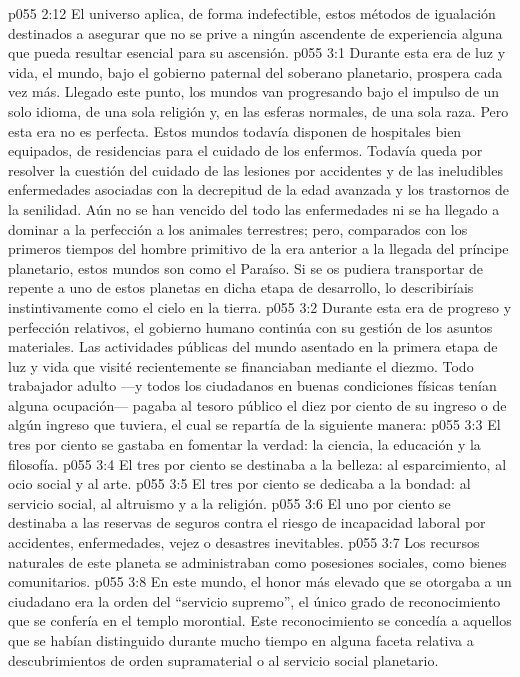 \vs p055 2:12 El universo aplica, de forma indefectible, estos métodos de igualación destinados a asegurar que no se prive a ningún ascendente de experiencia alguna que pueda resultar esencial para su ascensión.
\vs p055 3:1 Durante esta era de luz y vida, el mundo, bajo el gobierno paternal del soberano planetario, prospera cada vez más. Llegado este punto, los mundos van progresando bajo el impulso de un solo idioma, de una sola religión y, en las esferas normales, de una sola raza. Pero esta era no es perfecta. Estos mundos todavía disponen de hospitales bien equipados, de residencias para el cuidado de los enfermos. Todavía queda por resolver la cuestión del cuidado de las lesiones por accidentes y de las ineludibles enfermedades asociadas con la decrepitud de la edad avanzada y los trastornos de la senilidad. Aún no se han vencido del todo las enfermedades ni se ha llegado a dominar a la perfección a los animales terrestres; pero, comparados con los primeros tiempos del hombre primitivo de la era anterior a la llegada del príncipe planetario, estos mundos son como el Paraíso. Si se os pudiera transportar de repente a uno de estos planetas en dicha etapa de desarrollo, lo describiríais instintivamente como el cielo en la tierra.
\vs p055 3:2 \pc Durante esta era de progreso y perfección relativos, el gobierno humano continúa con su gestión de los asuntos materiales. Las actividades públicas del mundo asentado en la primera etapa de luz y vida que visité recientemente se financiaban mediante el diezmo. Todo trabajador adulto ---y todos los ciudadanos en buenas condiciones físicas tenían alguna ocupación--- pagaba al tesoro público el diez por ciento de su ingreso o de algún ingreso que tuviera, el cual se repartía de la siguiente manera:
\vs p055 3:3 El tres por ciento se gastaba en fomentar la verdad: la ciencia, la educación y la filosofía.
\vs p055 3:4 El tres por ciento se destinaba a la belleza: al esparcimiento, al ocio social y al arte.
\vs p055 3:5 El tres por ciento se dedicaba a la bondad: al servicio social, al altruismo y a la religión.
\vs p055 3:6 El uno por ciento se destinaba a las reservas de seguros contra el riesgo de incapacidad laboral por accidentes, enfermedades, vejez o desastres inevitables.
\vs p055 3:7 \pc Los recursos naturales de este planeta se administraban como posesiones sociales, como bienes comunitarios.
\vs p055 3:8 En este mundo, el honor más elevado que se otorgaba a un ciudadano era la orden del “servicio supremo”, el único grado de reconocimiento que se confería en el templo morontial. Este reconocimiento se concedía a aquellos que se habían distinguido durante mucho tiempo en alguna faceta relativa a descubrimientos de orden supramaterial o al servicio social planetario.
